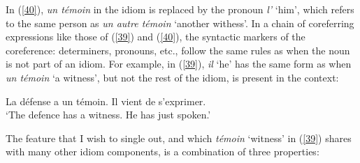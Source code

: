 \documentclass[output=paper]{langsci/langscibook}
\begin{document}
\noindent In (\ref{40}), \textit{un témoin} in the idiom is replaced by the pronoun \textit{l’} ‘him’, which refers to the same person as \textit{un autre témoin} ‘another withess’. In a chain of coreferring expressions like those of (\ref{39}) and (\ref{40}), the syntactic markers of the coreference: determiners, pronouns, etc., follow the same rules as when the noun is not part of an idiom. For example, in (\ref{39}), \textit{il} ‘he’ has the same form as when \textit{un témoin} ‘a witness’, but not the rest of the idiom, is present in the context:

\begin{exe}
\ex \label{41}
La défense a un témoin. Il vient de s'exprimer.\\
 ‘The defence has a witness. He has just spoken.’
\end{exe}
 
 
\noindent The feature that I wish to single out, and which \textit{témoin} ‘witness’ in (\ref{39}) shares with many other idiom components, is a combination of three properties:
\end{document}
